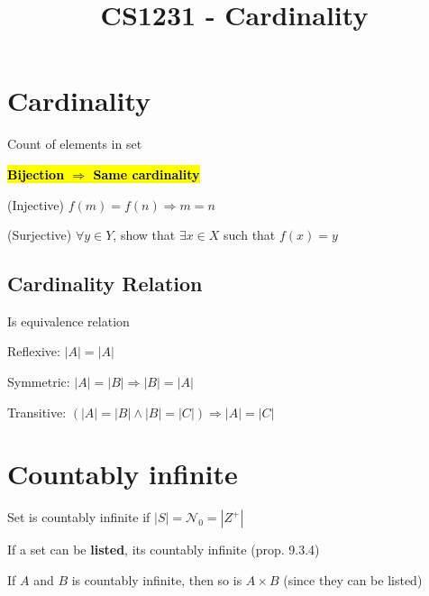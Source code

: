 \documentclass[12pt]{article}
\title{\textbf{CS1231 - Cardinality}}
\date{}
\begin{document}
\maketitle

\begin{spacing}{1.5}

\section{Cardinality}

\begin{itemize*}
	\item Count of elements in set
	\item \textbf{\hl{Bijection $\Rightarrow$ Same cardinality}}
		\begin{enumerate*}
			\item (Injective) $f(m) = f(n) \Rightarrow m = n$
			\item (Surjective) $\forall y \in Y$, show that $\exists x \in X$ such that $f(x) = y$
		\end{enumerate*}
\end{itemize*}

\subsection{Cardinality Relation}

Is equivalence relation 

\begin{itemize*}
	\item Reflexive: $|A| = |A|$
	\item Symmetric: $|A| = |B| \Rightarrow |B| = |A|$
	\item Transitive: $(|A| = |B| \wedge |B| = |C|) \Rightarrow |A| = |C|$
\end{itemize*}

\section{Countably infinite}

\begin{itemize*}
	\item Set is countably infinite if $|S| = \mathcal{N}_0 = |Z^+|$

	\item If a set can be \textbf{listed}, its countably infinite (prop. 9.3.4)

	\item If $A$ and $B$ is countably infinite, then so is $A \times B$ (since they can be listed)


\end{itemize*}
\end{spacing}
\end{document}
